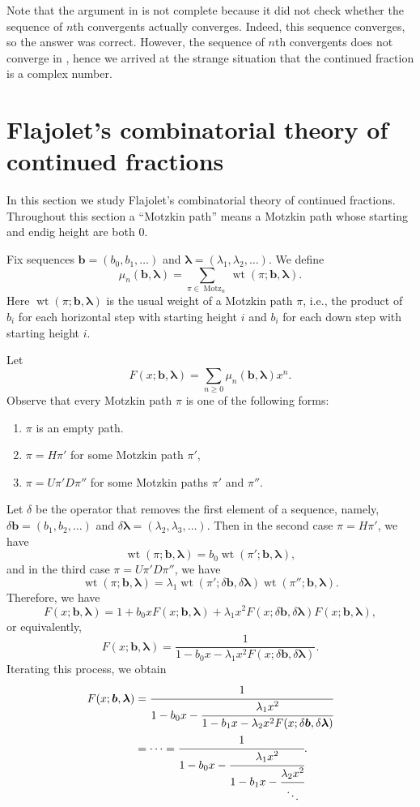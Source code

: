 \documentclass[oneside]{book}
\numberwithin{equation}{section}
\theoremstyle{definition}
\newcommand\Motz{\operatorname{Motz}}
\newcommand\wt{\operatorname{wt}}
\renewcommand\vec[1]{\bm{#1}}
\newcommand\vb{\vec{b}}
\newcommand\vla{\vec{\lambda}}
\begin{document}
Note that the argument in  is not complete because it did
not check whether the sequence of \( n \)th convergents actually
converges. Indeed, this sequence converges, so the answer was correct.
However, the sequence of \( n \)th convergents does not converge in
, hence we arrived at the strange situation that the
continued fraction is a complex number.


\section{Flajolet's combinatorial theory of continued fractions}

In this section we study Flajolet's combinatorial theory of continued
fractions. Throughout this section a ``Motzkin path'' means a Motzkin
path whose starting and endig height are both \( 0 \).

Fix sequences \( \vb = (b_0, b_1,\dots) \) and
\( \vla = (\lambda_1, \lambda_2,\dots) \).
We define
\[
  \mu_n(\vb, \vla) = \sum_{\pi\in \Motz_n}  \wt(\pi; \vb,\vla).
\]
Here \( \wt(\pi; \vb,\vla) \) is the usual weight of a Motzkin path
\( \pi \), i.e., the product of \( b_i \) for each horizontal step
with starting height \( i \) and \( b_i \) for each down step with
starting height \( i \).


Let
\[
  F(x;\vb,\vla) = \sum_{n\ge0} \mu_n(\vb, \vla) x^n. 
\]
Observe that every Motzkin path \( \pi \) is one of the following
forms:
\begin{enumerate}
\item \( \pi \) is an empty path.
\item \( \pi = H \pi' \) for some Motzkin path \( \pi' \),
\item \( \pi = U \pi' D \pi'' \) for some Motzkin paths \( \pi' \) and
  \( \pi'' \).
\end{enumerate}

Let \( \delta \) be the operator that removes the first element of a
sequence, namely, \( \delta \vb = (b_1,b_2,\dots) \) and
\( \delta \vla = (\lambda_2,\lambda_3,\dots) \).
Then in the second case \( \pi = H \pi' \), we have
\[
  \wt(\pi;\vb,\vla) = b_0 \wt(\pi';\vb,\vla),
\]
and in the third case \( \pi = U \pi' D \pi'' \), we have
\[
  \wt(\pi;\vb,\vla) = \lambda_1 \wt(\pi';\delta\vb,\delta\vla)
  \wt(\pi'';\vb,\vla).
\]
Therefore, we have
\[
  F(x;\vb,\vla) = 1 + b_0x F(x;\vb,\vla) + \lambda_1 x^2
  F(x;\delta\vb, \delta\vla) F(x;\vb,\vla),
\]
or equivalently,
\[
  F(x;\vb,\vla) = \frac{1}{1 - b_0x - \lambda_1 x^2 F(x;\delta\vb, \delta\vla)}.
\]
Iterating this process, we obtain
\begin{align}
\notag  F(x;\vb,\vla)
  &= \cfrac{1}{
    1-b_0x- \cfrac{\lambda_1x^2}{
    1 - b_1x - \lambda_2 x^2 F(x;\delta\vb, \delta\vla)}}\\
\label{eq:47}  &=  \cdots = \cfrac{1}{
    1-b_0x- \cfrac{\lambda_1x^2}{
      1-b_1x- \cfrac{\lambda_2x^2}{\ddots}}}.
\end{align}
\end{document}
